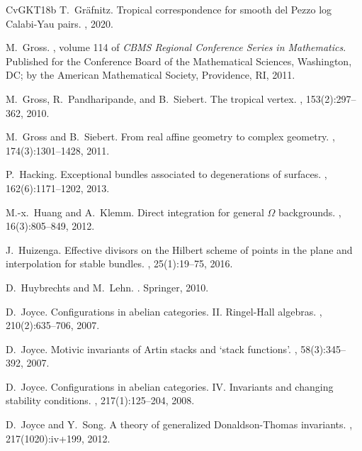 \documentclass[12pt, a4paper]{amsart}
\begin{document}
\begin{thebibliography}{CvGKT18b}
T.~Gr{\"a}fnitz.
\newblock Tropical correspondence for smooth del {P}ezzo log {C}alabi-{Y}au pairs.
, 2020.

M.~Gross.
, volume 114 of {\em CBMS
  Regional Conference Series in Mathematics}.
\newblock Published for the Conference Board of the Mathematical Sciences,
  Washington, DC; by the American Mathematical Society, Providence, RI, 2011.


M.~Gross, R.~Pandharipande, and B.~Siebert.
\newblock The tropical vertex.
, 153(2):297--362, 2010.


M.~Gross and B.~Siebert.
\newblock From real affine geometry to complex geometry.
, 174(3):1301--1428, 2011.

P.~Hacking.
\newblock Exceptional bundles associated to degenerations of surfaces.
, 162(6):1171--1202, 2013.


M.-x.~Huang and A.~Klemm.
\newblock Direct integration for general {$\Omega$} backgrounds.
, 16(3):805--849, 2012.

J.~Huizenga.
\newblock Effective divisors on the {H}ilbert scheme of points in the plane and
  interpolation for stable bundles.
, 25(1):19--75, 2016.

D.~Huybrechts and M.~Lehn.
.
\newblock Springer, 2010.



D.~Joyce.
\newblock Configurations in abelian categories. {II}. {R}ingel-{H}all algebras.
, 210(2):635--706, 2007.

D.~Joyce.
\newblock Motivic invariants of {A}rtin stacks and `stack functions'.
, 58(3):345--392, 2007.

D.~Joyce.
\newblock Configurations in abelian categories. {IV}. {I}nvariants and changing
  stability conditions.
, 217(1):125--204, 2008.

D.~Joyce and Y.~Song.
\newblock A theory of generalized {D}onaldson-{T}homas invariants.
, 217(1020):iv+199, 2012.



\end{thebibliography}
\end{document}
